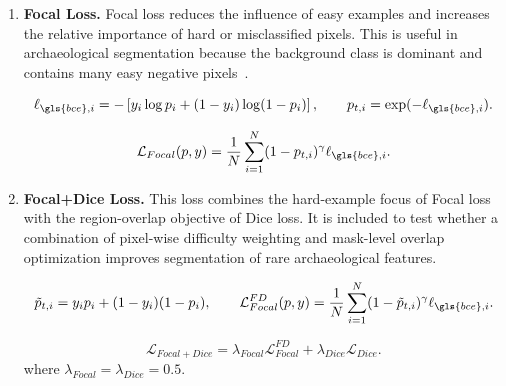 \begin{enumerate}
    \begin{equation}
        T(p,y) =
        \frac{\sum_{i=1}^{N}p_i y_i + \epsilon}
        {\sum_{i=1}^{N}p_i^2 + \sum_{i=1}^{N}y_i^2 - \sum_{i=1}^{N}p_i y_i + \epsilon}.
    \end{equation}

    \begin{equation}
        \mathcal{L}_{TanimotoC}
        =
        1 -
        \frac{1}{2}
        \left[
        T(p,y) + T(1-p,1-y)
        \right].
    \end{equation}

    \item \textbf{Focal Loss.} Focal loss reduces the influence of easy examples and increases the relative importance of hard or misclassified pixels. This is useful in archaeological segmentation because the background class is dominant and contains many easy negative pixels~\cite{lin2017focal}.

    \begin{equation}
        \ell_{\gls{bce},i}
        =
        -
        \left[
        y_i\log p_i + (1-y_i)\log(1-p_i)
        \right],
        \qquad
        p_{t,i}=\exp(-\ell_{\gls{bce},i}).
    \end{equation}

    \begin{equation}
        \mathcal{L}_{Focal}(p,y) =
        \frac{1}{N}\sum_{i=1}^{N}
        (1-p_{t,i})^\gamma \ell_{\gls{bce},i}.
    \end{equation}

    \item \textbf{Focal+Dice Loss.} This loss combines the hard-example focus of Focal loss with the region-overlap objective of Dice loss. It is included to test whether a combination of pixel-wise difficulty weighting and mask-level overlap optimization improves segmentation of rare archaeological features.

    \begin{equation}
        \tilde{p}_{t,i}
        =
        y_i p_i + (1-y_i)(1-p_i),
        \qquad
        \mathcal{L}_{Focal}^{FD}(p,y)
        =
        \frac{1}{N}\sum_{i=1}^{N}
        (1-\tilde{p}_{t,i})^\gamma \ell_{\gls{bce},i}.
    \end{equation}

    \begin{equation}
        \mathcal{L}_{Focal+Dice}
        =
        \lambda_{Focal}\mathcal{L}_{Focal}^{FD}
        +
        \lambda_{Dice}\mathcal{L}_{Dice}.
    \end{equation}
    where \(\lambda_{Focal} = \lambda_{Dice} = 0.5\).


\end{enumerate}
